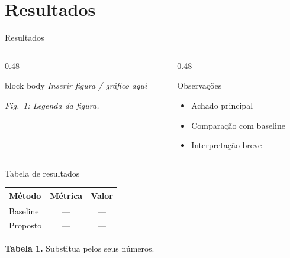 \documentclass[aspectratio=169, 11pt, brazil]{beamer}
\begin{document}
\section{Resultados}

\begin{frame}{Resultados}
  \begin{columns}[T,onlytextwidth]
    \begin{column}{0.48\textwidth}
      \centering
      \begin{beamercolorbox}[wd=\textwidth, rounded=true, sep=8pt, center]{block body}
        \vspace{1.4cm}
        {\small\textit{Inserir figura / gráfico aqui}}
        \vspace{1.4cm}
      \end{beamercolorbox}
      \vspace{0.35em}
      {\footnotesize\textit{Fig.~1: Legenda da figura.}}
    \end{column}
    \begin{column}{0.48\textwidth}
      \begin{block}{Observações}
        \begin{itemize}
          \item Achado principal
          \item Comparação com baseline
          \item Interpretação breve
        \end{itemize}
      \end{block}
    \end{column}
  \end{columns}
\end{frame}

\begin{frame}{Tabela de resultados}
  \centering
  \small
  \renewcommand{\arraystretch}{1.2}
  \begin{tabular}{@{}lcc@{}}
    \toprule
    \textbf{Método} & \textbf{Métrica} & \textbf{Valor} \\
    \midrule
    Baseline & --- & --- \\
    Proposto & --- & --- \\
    \bottomrule
  \end{tabular}

  \vspace{0.75em}
  {\footnotesize\textcolor{icompDarkGray}{%
    \textbf{Tabela 1.} Substitua pelos seus números.}}
\end{frame}
\end{document}
